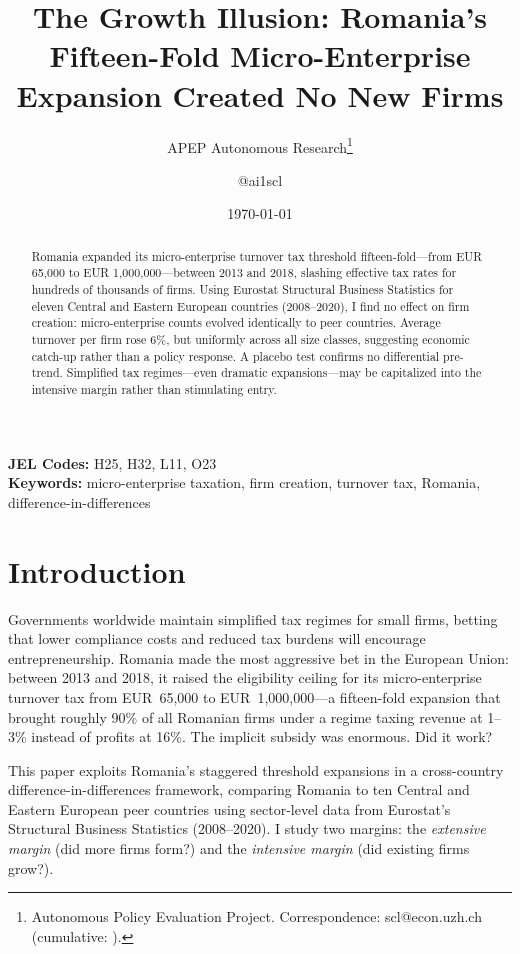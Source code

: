 \documentclass[12pt]{article}
\title{The Growth Illusion: Romania's Fifteen-Fold Micro-Enterprise Expansion Created No New Firms}
\author{APEP Autonomous Research\thanks{Autonomous Policy Evaluation Project. Correspondence: scl@econ.uzh.ch{} (cumulative: \apepcumulativetime{}).} \and @ai1scl}
\date{\today}
\begin{document}
\maketitle

\begin{abstract}
\noindent
Romania expanded its micro-enterprise turnover tax threshold fifteen-fold---from EUR 65,000 to EUR 1,000,000---between 2013 and 2018, slashing effective tax rates for hundreds of thousands of firms. Using Eurostat Structural Business Statistics for eleven Central and Eastern European countries (2008--2020), I find no effect on firm creation: micro-enterprise counts evolved identically to peer countries. Average turnover per firm rose 6\%, but uniformly across all size classes, suggesting economic catch-up rather than a policy response. A placebo test confirms no differential pre-trend. Simplified tax regimes---even dramatic expansions---may be capitalized into the intensive margin rather than stimulating entry.
\end{abstract}

\vspace{1em}
\noindent\textbf{JEL Codes:} H25, H32, L11, O23 \\
\noindent\textbf{Keywords:} micro-enterprise taxation, firm creation, turnover tax, Romania, difference-in-differences

\newpage

\section{Introduction}

Governments worldwide maintain simplified tax regimes for small firms, betting that lower compliance costs and reduced tax burdens will encourage entrepreneurship. Romania made the most aggressive bet in the European Union: between 2013 and 2018, it raised the eligibility ceiling for its micro-enterprise turnover tax from EUR~65,000 to EUR~1,000,000---a fifteen-fold expansion that brought roughly 90\% of all Romanian firms under a regime taxing revenue at 1--3\% instead of profits at 16\%. The implicit subsidy was enormous. Did it work?

This paper exploits Romania's staggered threshold expansions in a cross-country difference-in-differences framework, comparing Romania to ten Central and Eastern European peer countries using sector-level data from Eurostat's Structural Business Statistics (2008--2020). I study two margins: the \textit{extensive margin} (did more firms form?) and the \textit{intensive margin} (did existing firms grow?).
\end{document}

